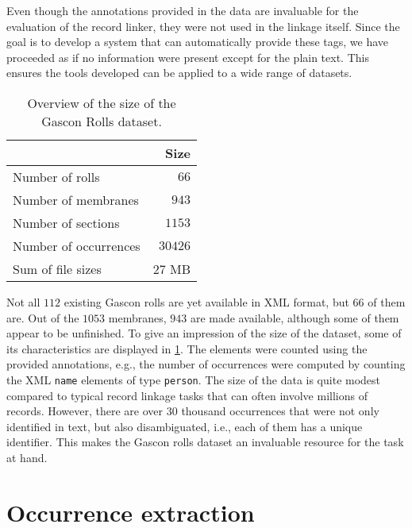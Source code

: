 Even though the annotations provided in the data are invaluable for the evaluation of the record linker, they were not used in the linkage itself.
Since the goal is to develop a system that can automatically provide these tags, we have proceeded as if no information were present except for the plain text.
This ensures the tools developed can be applied to a wide range of datasets.

\begin{table}
    \centering
    \caption{Overview of the size of the Gascon Rolls dataset.}
    \label{tab:data_overview}
    \begin{tabular}{l r}
        \toprule
        & Size \\
        \midrule
        Number of rolls & $66$ \\
        Number of membranes & $943$ \\
        Number of sections & $1153$ \\
        Number of occurrences & $30426$ \\
        Sum of file sizes & $27$ MB \\
        \bottomrule
    \end{tabular}
\end{table}

Not all $112$ existing Gascon rolls are yet available in XML format, but $66$ of them are.
Out of the $1053$ membranes, $943$ are made available, although some of them appear to be unfinished.
To give an impression of the size of the dataset, some of its characteristics are displayed in \cref{tab:data_overview}.
The elements were counted using the provided annotations, e.g., the number of occurrences were computed by counting the XML \texttt{name} elements of type \texttt{person}.
The size of the data is quite modest compared to typical record linkage tasks that can often involve millions of records.
However, there are over $30$ thousand occurrences that were not only identified in text, but also disambiguated, i.e., each of them has a unique identifier.
This makes the Gascon rolls dataset an invaluable resource for the task at hand.




\section{Occurrence extraction}
\label{sec:occurrence_extraction}

